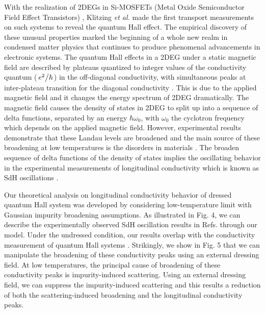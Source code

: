 \documentclass{article}
\begin{document}
\begin{itemize}
{  With the realization of 2DEGs in Si-MOSFETs (Metal Oxide Semiconductor Field Effect Transistors) \citep{fowler66}, Klitzing \textit{et al.} \cite{klitzing80} made the first transport measurements on such systems to reveal the quantum Hall effect. The empirical discovery of these unusual properties marked the beginning of a whole new realm in condensed matter physics that continues to produce phenomenal advancements in electronic systems. The quantum Hall effects in a 2DEG under a static magnetic field are described by plateaus quantized to integer values of the conductivity quantum ($\flatfrac{e^2}{\hbar}$) in the off-diagonal conductivity, with simultaneous peaks at inter-plateau transition for the diagonal conductivity \cite{endo09}. This is due to the applied magnetic field and it changes the energy spectrum of 2DEG dramatically. The magnetic field causes the density of states in 2DEG to split up into a sequence of delta functions, separated by an energy $\hbar\omega_0$, with $\omega_0$ the cyclotron frequency which depends on the applied magnetic field.
  However, experimental results demonstrate that these Landau levels are broadened and the main source of these broadening at low temperatures is the disorders in materials \cite{ando85,dial07}. The broaden sequence of delta functions of the density of states implies the oscillating behavior in the experimental measurements of longitudinal conductivity which is known as SdH oscillations \cite{endo09,wakabayashi78}.

  Our theoretical analysis on longitudinal conductivity behavior of dressed quantum Hall system was developed by considering low-temperature limit with Gaussian impurity broadening assumptions.
  As illustrated in Fig. 4, we can describe the experimentally observed SdH oscillation results in Refs.\cite{endo09,wakabayashi78} through our model.
  Under the undressed condition, our results overlap with the conductivity measurement of quantum Hall systems \cite{endo09}. Strikingly, we show in Fig. 5 that we can manipulate the broadening of these conductivity peaks using an external dressing field. At low temperatures, the principal cause of broadening of these conductivity peaks is impurity-induced scattering. Using an external dressing field, we can suppress the impurity-induced scattering and this results a reduction of both the scattering-induced broadening and the longitudinal conductivity peaks.

}
\end{itemize}
\end{document}
